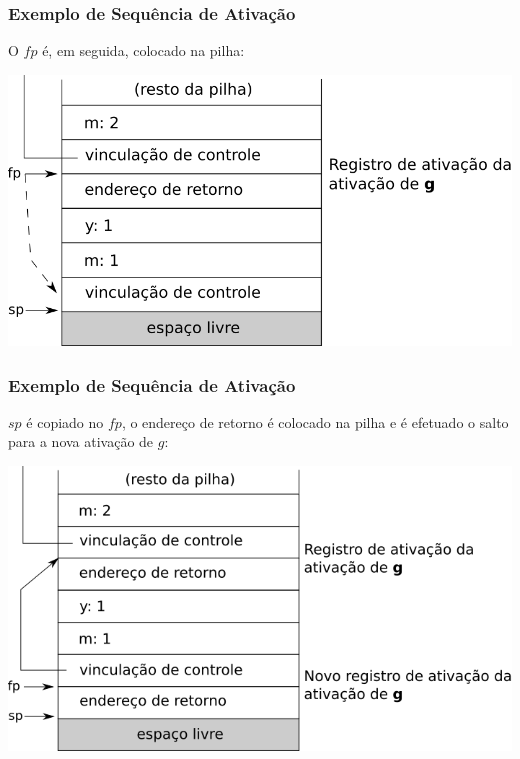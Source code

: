 \documentclass[table]{beamer}
\begin{document}
\begin{frame}
   \frametitle{Exemplo de Sequência de Ativação}
   O $fp$ é, em seguida, colocado na pilha: \\
   \begin{center}
   \includegraphics[width=\linewidth,height=\textheight,keepaspectratio]{figuras/sequenciaativacao03.png}
   \end{center}
\end{frame}

\begin{frame}
   \frametitle{Exemplo de Sequência de Ativação}
   $sp$ é copiado no $fp$, o endereço de retorno é colocado na pilha e é efetuado o salto para a nova ativação de $g$: \\
   \begin{center}
   \includegraphics[width=\linewidth,height=\textheight,keepaspectratio]{figuras/sequenciaativacao04.png}
   \end{center}
\end{frame}
\end{document}
